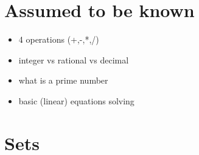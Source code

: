 \hypertarget{assumed-to-be-known}{%
\section{Assumed to be known}\label{assumed-to-be-known}}

\begin{itemize}
\tightlist
\item
  4 operations (+,-,*,/)
\item
  integer vs rational vs decimal
\item
  what is a prime number
\item
  basic (linear) equations solving
\end{itemize}

\hypertarget{sets}{%
\section{Sets}\label{sets}}

